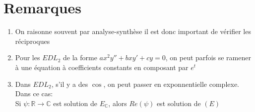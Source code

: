 \documentclass[fleqn]{article}
\theoremstyle{definition} \newtheorem*{defi}{D\'efinition}
\theoremstyle{definition} \newtheorem*{theo}{Th\'eor\`eme}
\theoremstyle{remark} \newtheorem*{rqs}{Remarques}
\begin{document}
\section{Remarques}
\begin{enumerate}
	\item On raisonne souvent par analyse-synth\`ese il est donc important de v\'erifier les r\'eciproques
	\item Pour les $EDL_2$ de la forme $ax^2y'' + bxy' + cy = 0$, on peut parfois se ramener \`a une \'equation \`a coefficients constants en composant par $e^t$
	\item Dans $EDL_2$, s'il y a des $\cos$, on peut passer en exponnentielle complexe. Dans ce cas: \\
		Si $\psi: \mathbb{R} \rightarrow \mathbb{C}$ est solution de $E_\mathbb{C}$, alors $Re(\psi)$ est solution de $(E)$
\end{enumerate}
\end{document}

